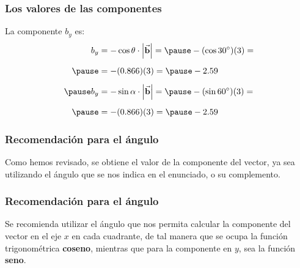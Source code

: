 \documentclass[12pt]{beamer}
\begin{document}
\begin{frame}
\frametitle{Los valores de las componentes}
\begin{minipage}{0.35\linewidth}
  \begin{figure}
\centering
{}
\end{figure}
\end{minipage}
\begin{minipage}{0.6\linewidth}
La componente $b_{y}$ es:
\begin{eqnarray*}
\begin{aligned}
b_{y} &= - \cos \theta \cdot \abs{\va{b}} = \pause - (\cos \ang{30})(3) = \\[0.5em] \pause
&= - (0.866)(3) = \pause - 2.59 \\[0.5em] \pause
b_{y} &= - \sin \alpha \cdot \abs{\va{b}} = \pause - (\sin \ang{60})(3) = \\[0.5em] \pause
&= - (0.866)(3) = \pause - 2.59
\end{aligned}
\end{eqnarray*}
\end{minipage}
\end{frame}
\begin{frame}
\frametitle{Recomendación para el ángulo}
Como hemos revisado, se obtiene el valor de la componente del vector, ya sea utilizando el ángulo que se nos indica en el enunciado, o su complemento.
\end{frame}
\begin{frame}
\frametitle{Recomendación para el ángulo}
Se recomienda utilizar el ángulo que nos permita calcular la componente del vector en el eje $x$ en cada cuadrante, de tal manera que se ocupa la función trigonométrica \textbf{coseno}, \pause mientras que para la componente en $y$, sea la función \textbf{seno}.
\end{frame}
\end{document}
